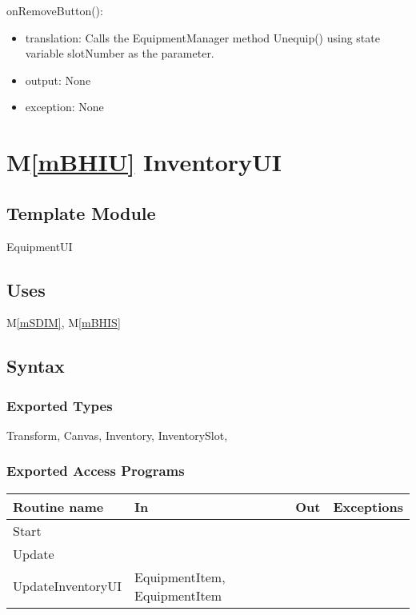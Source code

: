 \documentclass[12pt]{article}
\newcommand{\mref}[1]{M\ref{#1}}
\begin{document}
\noindent onRemoveButton():
\begin{itemize}
\item translation: Calls the EquipmentManager method Unequip() using state variable slotNumber as the parameter.
\item output: None
\item exception: None
\end{itemize}

\newpage

\section* {\mref{mBHIU} InventoryUI}

\subsection*{Template Module}

EquipmentUI

\subsection* {Uses}

\mref{mSDIM}, \mref{mBHIS}

\subsection* {Syntax}

\subsubsection* {Exported Types}

Transform, Canvas, Inventory, InventorySlot, 

\subsubsection* {Exported Access Programs}

\begin{tabular}{| l | l | l | l |}
\hline
\textbf{Routine name} & \textbf{In} & \textbf{Out} & \textbf{Exceptions}\\
\hline
Start & ~ & ~  & ~\\
Update & ~ & ~ & ~\\
UpdateInventoryUI & EquipmentItem, EquipmentItem & ~ & ~\\
\hline
\end{tabular}
\end{document}
